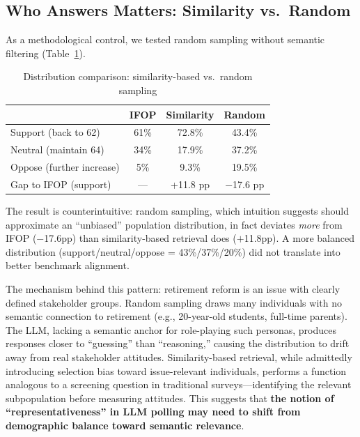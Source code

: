 \documentclass[11pt,a4paper]{article}
\begin{document}
\subsection{Who Answers Matters: Similarity vs.\ Random}

As a methodological control, we tested random sampling without semantic filtering (Table~\ref{tab:sampling_comparison}).

\begin{table}[H]
    \centering
    \caption{Distribution comparison: similarity-based vs.\ random sampling}
    \label{tab:sampling_comparison}
    \begin{tabular}{@{}lccc@{}}
        \toprule
        & \textbf{IFOP} & \textbf{Similarity} & \textbf{Random} \\
        \midrule
        Support (back to 62) & 61\% & 72.8\% & 43.4\% \\
        Neutral (maintain 64) & 34\% & 17.9\% & 37.2\% \\
        Oppose (further increase) & 5\% & 9.3\% & 19.5\% \\
        \midrule
        Gap to IFOP (support) & --- & +11.8 pp & $-$17.6 pp \\
        \bottomrule
    \end{tabular}
\end{table}

The result is counterintuitive: random sampling, which intuition suggests should approximate an ``unbiased'' population distribution, in fact deviates \textit{more} from IFOP ($-$17.6pp) than similarity-based retrieval does ($+$11.8pp). A more balanced distribution (support/neutral/oppose = 43\%/37\%/20\%) did not translate into better benchmark alignment.

The mechanism behind this pattern: retirement reform is an issue with clearly defined stakeholder groups. Random sampling draws many individuals with no semantic connection to retirement (e.g., 20-year-old students, full-time parents). The LLM, lacking a semantic anchor for role-playing such personas, produces responses closer to ``guessing'' than ``reasoning,'' causing the distribution to drift away from real stakeholder attitudes. Similarity-based retrieval, while admittedly introducing selection bias toward issue-relevant individuals, performs a function analogous to a screening question in traditional surveys---identifying the relevant subpopulation before measuring attitudes. This suggests that \textbf{the notion of ``representativeness'' in LLM polling may need to shift from demographic balance toward semantic relevance}.
\end{document}
